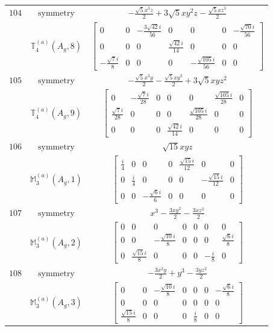 \documentclass[fleqn,8pt,landscape]{jsarticle}
\begin{document}
\begin{longtable}{ccc}
$ 104 $ & $ \text{symmetry} $ & $ - \frac{\sqrt{5} x^{3} z}{2} + 3 \sqrt{5} x y^{2} z - \frac{\sqrt{5} x z^{3}}{2} $ \\
$  $ & $ \mathbb{T}_{4}^{(a)}(A_{g},8) $ & $ \begin{bmatrix} 0 & 0 & - \frac{3 \sqrt{42} i}{56} & 0 & 0 & 0 & - \frac{\sqrt{70} i}{56} \\ 0 & 0 & 0 & \frac{\sqrt{42} i}{14} & 0 & 0 & 0 \\ - \frac{\sqrt{7} i}{8} & 0 & 0 & 0 & - \frac{\sqrt{105} i}{56} & 0 & 0 \end{bmatrix} $ \\ \hline
$ 105 $ & $ \text{symmetry} $ & $ - \frac{\sqrt{5} x^{3} y}{2} - \frac{\sqrt{5} x y^{3}}{2} + 3 \sqrt{5} x y z^{2} $ \\
$  $ & $ \mathbb{T}_{4}^{(a)}(A_{g},9) $ & $ \begin{bmatrix} 0 & - \frac{\sqrt{7} i}{28} & 0 & 0 & 0 & \frac{\sqrt{105} i}{28} & 0 \\ \frac{\sqrt{7} i}{28} & 0 & 0 & 0 & \frac{\sqrt{105} i}{28} & 0 & 0 \\ 0 & 0 & 0 & \frac{\sqrt{42} i}{14} & 0 & 0 & 0 \end{bmatrix} $ \\ \hline
$ 106 $ & $ \text{symmetry} $ & $ \sqrt{15} x y z $ \\
$  $ & $ \mathbb{M}_{3}^{(a)}(A_{g},1) $ & $ \begin{bmatrix} \frac{i}{4} & 0 & 0 & 0 & \frac{\sqrt{15} i}{12} & 0 & 0 \\ 0 & \frac{i}{4} & 0 & 0 & 0 & - \frac{\sqrt{15} i}{12} & 0 \\ 0 & 0 & - \frac{\sqrt{6} i}{6} & 0 & 0 & 0 & 0 \end{bmatrix} $ \\ \hline
$ 107 $ & $ \text{symmetry} $ & $ x^{3} - \frac{3 x y^{2}}{2} - \frac{3 x z^{2}}{2} $ \\
$  $ & $ \mathbb{M}_{3}^{(a)}(A_{g},2) $ & $ \begin{bmatrix} 0 & 0 & 0 & 0 & 0 & 0 & 0 \\ 0 & 0 & - \frac{\sqrt{10} i}{8} & 0 & 0 & 0 & \frac{\sqrt{6} i}{8} \\ 0 & \frac{\sqrt{15} i}{8} & 0 & 0 & 0 & - \frac{i}{8} & 0 \end{bmatrix} $ \\ \hline
$ 108 $ & $ \text{symmetry} $ & $ - \frac{3 x^{2} y}{2} + y^{3} - \frac{3 y z^{2}}{2} $ \\
$  $ & $ \mathbb{M}_{3}^{(a)}(A_{g},3) $ & $ \begin{bmatrix} 0 & 0 & - \frac{\sqrt{10} i}{8} & 0 & 0 & 0 & - \frac{\sqrt{6} i}{8} \\ 0 & 0 & 0 & 0 & 0 & 0 & 0 \\ \frac{\sqrt{15} i}{8} & 0 & 0 & 0 & \frac{i}{8} & 0 & 0 \end{bmatrix} $ \\ \hline

\end{longtable}
\end{document}
